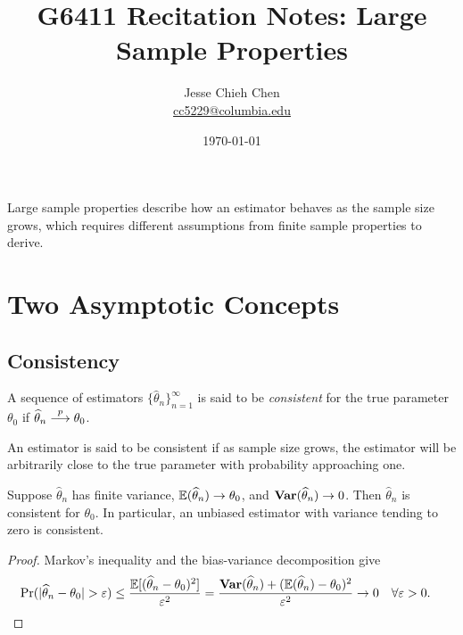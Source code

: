 \documentclass[a4paper,12pt]{article}
\title{G6411 Recitation Notes: \glsentryshort{ols} Large Sample Properties}
\author{Jesse Chieh Chen\\\href{mailto:cc5229@columbia.edu}{cc5229@columbia.edu}}
\date{\today}
\begin{document}
\maketitle

\noindent
Large sample properties describe how an estimator behaves as the sample size grows,
which requires different assumptions from finite sample properties to derive.

\section{Two Asymptotic Concepts}

\subsection{Consistency}

\begin{definition}[Consistency]
	A sequence of estimators $\{\widehat\theta_n\}_{n=1}^{\infty}$
	is said to be \emph{consistent} for the true parameter $\theta_0$ if $\widehat\theta_n\overset{p}{\longrightarrow}\theta_0$.
\end{definition}

\begin{remark}
	An estimator is said to be consistent if as sample size grows,
	the estimator will be arbitrarily close to the true parameter with probability approaching one.
\end{remark}

\begin{lemma}\label{cor-consistency}
	Suppose $\widehat\theta_n$ has finite variance,
	$\operatorname{\mathbb{E}}(\widehat\theta_n)\to\theta_0$, and $\operatorname{\text{\textrm{\upshape\textbf{Var}}}}(\widehat\theta_n)\to0$.
	Then $\widehat\theta_n$ is consistent for $\theta_0$.
	In particular, an unbiased estimator with variance tending to zero is consistent.
\end{lemma}
\begin{proof}
	Markov's inequality and the bias-variance decomposition give
	\begin{align*}
		\Pr(|\widehat\theta_n-\theta_0|>\varepsilon)
		&\le\frac{\E[(\widehat\theta_n-\theta_0)^2]}{\varepsilon^2}
		=\frac{\var(\widehat\theta_n)+(\E(\widehat\theta_n)-\theta_0)^2}{\varepsilon^2}
		\to0
		\quad\forall \varepsilon>0.
		\qedhere
	\end{align*}
\end{proof}
\end{document}
